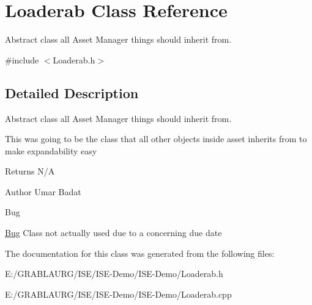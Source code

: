 \hypertarget{class_loaderab}{\section{Loaderab Class Reference}
\label{class_loaderab}
}


Abstract class all Asset Manager things should inherit from.  




{\ttfamily \#include $<$Loaderab.\-h$>$}



\subsection{Detailed Description}
Abstract class all Asset Manager things should inherit from. 

This was going to be the class that all other objects inside asset inherits from to make expandability easy \begin{DoxyReturn}{Returns}
N/\-A
\end{DoxyReturn}
\begin{DoxyAuthor}{Author}
Umar Badat 
\end{DoxyAuthor}
\begin{DoxyRefDesc}{Bug}
\item[\hyperlink{bug__bug000003}{Bug}]Class not actually used due to a concerning due date \end{DoxyRefDesc}


The documentation for this class was generated from the following files\-:\begin{DoxyCompactItemize}
\item 
E\-:/\-G\-R\-A\-B\-L\-A\-U\-R\-G/\-I\-S\-E/\-I\-S\-E-\/\-Demo/\-I\-S\-E-\/\-Demo/Loaderab.\-h\item 
E\-:/\-G\-R\-A\-B\-L\-A\-U\-R\-G/\-I\-S\-E/\-I\-S\-E-\/\-Demo/\-I\-S\-E-\/\-Demo/Loaderab.\-cpp\end{DoxyCompactItemize}
